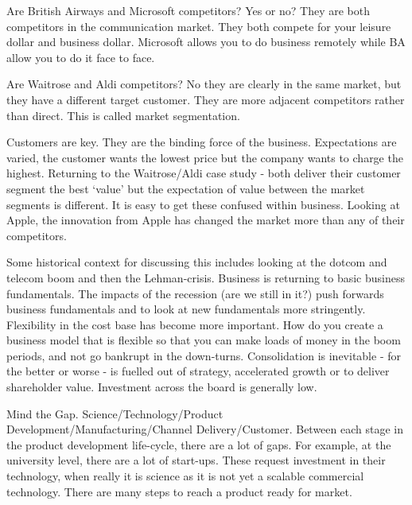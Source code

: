 Are British Airways and Microsoft competitors? Yes or no? They are both competitors in the communication market. They both compete for your leisure dollar and business dollar. Microsoft allows you to do business remotely while BA allow you to do it face to face.

Are Waitrose and Aldi competitors? No they are clearly in the same market, but they have a different target customer. They are more adjacent competitors rather than direct. This is called market segmentation. 

Customers are key. They are the binding force of the business. Expectations are varied, the customer wants the lowest price but the company wants to charge the highest. Returning to the Waitrose/Aldi case study - both deliver their customer segment the best `value' but the expectation of value between the market segments is different. It is easy to get these confused within business. Looking at Apple, the innovation from Apple has changed the market more than any of their competitors.

Some historical context for discussing this includes looking at the dotcom and telecom boom and then the Lehman-crisis. Business is returning to basic business fundamentals. The impacts of the recession (are we still in it?) push forwards business fundamentals and to look at new fundamentals more stringently. Flexibility in the cost base has become more important. How do you create a business model that is flexible so that you can make loads of money in the boom periods, and not go bankrupt in the down-turns. Consolidation is inevitable - for the better or worse - is fuelled out of strategy, accelerated growth or to deliver shareholder value. Investment across the board is generally low.

Mind the Gap. Science/Technology/Product Development/Manufacturing/Channel Delivery/Customer. Between each stage in the product development life-cycle, there are a lot of gaps. For example, at the university level, there are a lot of start-ups. These request investment in their technology, when really it is science as it is not yet a scalable commercial technology. There are many steps to reach a product ready for market. 


